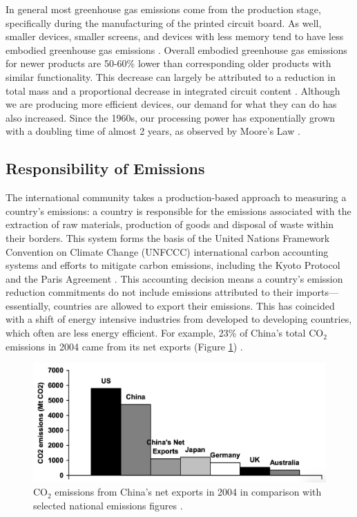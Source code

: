 \documentclass{article}
\begin{document}
In general most greenhouse gas emissions come from the production stage, specifically during the manufacturing of the printed circuit board. As well, smaller devices, smaller screens, and devices with less memory tend to have less embodied greenhouse gas emissions \cite{louis2020sources, teehan2013comparing}. Overall embodied greenhouse gas emissions for newer products are 50-60\% lower than corresponding older products with similar functionality. This decrease can largely be attributed to a reduction in total mass and a proportional decrease in integrated circuit content \cite{teehan2013comparing}. Although we are producing more efficient devices, our demand for what they can do has also increased. Since the 1960s, our processing power has exponentially grown with a doubling time of almost 2 years, as observed by Moore's Law \cite{schaller1997moore}.


\subsection{Responsibility of Emissions}\label{SECTION_RESPONSIBILITY_OF_EMISSIONS}
The international community takes a production-based approach to measuring a country's emissions: a country is responsible for the emissions associated with the extraction of raw materials, production of goods and disposal of waste within their borders. This system forms the basis of the United Nations Framework Convention on Climate Change (UNFCCC) international carbon accounting systems and efforts to mitigate carbon emissions, including the Kyoto Protocol and the Paris Agreement \cite{unfccc2009kyoto, unfccc2015paris}. This accounting decision means a country's emission reduction commitments do not include emissions attributed to their imports---essentially, countries are allowed to export their emissions. This has coincided with a shift of energy intensive industries from developed to developing countries, which often are less energy efficient. For example, 23\% of China's total CO$_2$ emissions in 2004 came from its net exports (Figure \ref{emissions_China_export}) \cite{wang2007owns}.

\begin{figure}[h]
    \includegraphics[width=.9 \textwidth]{./images/emissions_China_export.png}
    \centering
    \caption{CO$_2$ emissions from China's net exports in 2004 in comparison with selected national emissions figures \cite{wang2007owns}.}
    \label{emissions_China_export}
\end{figure}
\end{document}
